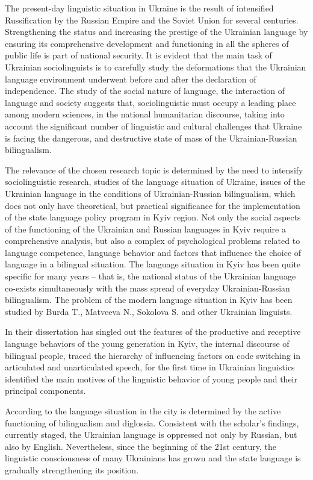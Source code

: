 \documentclass[english]{textolivre}
\begin{document}
The present-day linguistic situation in Ukraine is the result of intensified Russification by the Russian Empire and the Soviet Union for several centuries. Strengthening the status and increasing the prestige of the Ukrainian language by ensuring its comprehensive development and functioning in all the spheres of public life is part of national security. It is evident that the main task of Ukrainian sociolinguists is to carefully study the deformations that the Ukrainian language environment underwent before and after the declaration of independence. The study of the social nature of language, the interaction of language and society suggests that, sociolinguistic must occupy a leading place among modern sciences, in the national humanitarian discourse, taking into account the significant number of linguistic and cultural challenges that Ukraine is facing the dangerous, and destructive state of mass of the Ukrainian-Russian bilingualism.

The relevance of the chosen research topic is determined by the need to intensify sociolinguistic research, studies of the language situation of Ukraine, issues of the Ukrainian language in the conditions of Ukrainian-Russian bilingualism, which does not only have theoretical, but practical significance for the implementation of the state language policy program in Kyiv region. Not only the social aspects of the functioning of the Ukrainian and Russian languages in Kyiv require a comprehensive analysis, but also a complex of psychological problems related to language competence, language behavior and factors that influence the choice of language in a bilingual situation. The language situation in Kyiv has been quite specific for many years – that is, the national status of the Ukrainian language co-exists simultaneously with the mass spread of everyday Ukrainian-Russian bilingualism. The problem of the modern language situation in Kyiv has been studied by Burda T., Matveeva N., Sokolova S. and other Ukrainian linguists. 

In their dissertation \textcite{burda2001} has singled out the features of the productive and receptive language behaviors of the young generation in Kyiv, the internal discourse of bilingual people, traced the hierarchy of influencing factors on code switching in articulated and unarticulated speech, for the first time in Ukrainian linguistics identified the main motives of the linguistic behavior of young people and their principal components.

According to \textcite{matveieva2020} the language situation in the city is determined by the active functioning of bilingualism and diglossia. Consistent with the scholar's findings, currently staged, the Ukrainian language is oppressed not only by Russian, but also by English. Nevertheless, since the beginning of the 21st century, the linguistic consciousness of many Ukrainians has grown and the state language is gradually strengthening its position.
\end{document}
